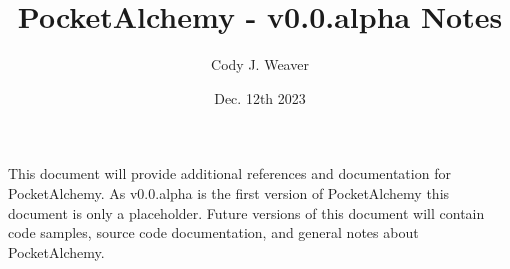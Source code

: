 \documentclass[12pt]{article}
\begin{document}
\title{PocketAlchemy - v0.0.alpha Notes}
\author{Cody J. Weaver}
\date{Dec. 12th 2023}
\maketitle

\begin{center}

\indent This document will provide additional references and 
documentation for PocketAlchemy. As v0.0.alpha is the first version
of PocketAlchemy this document is only a placeholder. Future versions
of this document will contain code samples, source code documentation,
and general notes about PocketAlchemy.

\end{center}
    
\end{document}
